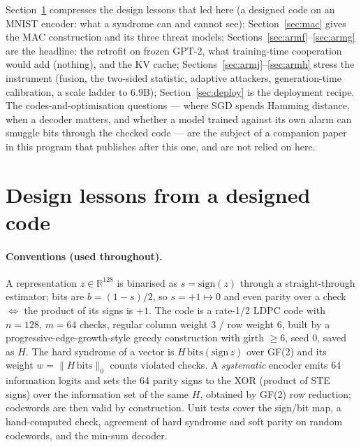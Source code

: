 \documentclass[10pt,twocolumn]{article}
\begin{document}
Section~\ref{sec:lessons} compresses the design lessons that led here (a designed
code on an MNIST encoder: what a syndrome can and cannot see); Section~\ref{sec:mac}
gives the MAC construction and its three threat models; Sections~\ref{sec:armf}--\ref{sec:armg}
are the headline: the retrofit on frozen GPT-2, what training-time cooperation
would add (nothing), and the KV cache; Sections~\ref{sec:armj}--\ref{sec:armh} stress the
instrument (fusion, the two-sided statistic, adaptive attackers, generation-time
calibration, a scale ladder to 6.9B); Section~\ref{sec:deploy} is the deployment
recipe. The codes-and-optimisation questions --- where SGD spends Hamming distance,
when a decoder matters, and whether a model trained against its own alarm can
smuggle bits through the checked code --- are the subject of a companion paper in this program that publishes after this one, and are not relied on here.

\section{Design lessons from a designed code}\label{sec:lessons}
\paragraph{Conventions (used throughout).} A representation $z\in\mathbb{R}^{128}$
is binarised as $s=\mathrm{sign}(z)$ through a straight-through estimator; bits are
$b=(1-s)/2$, so $s{=}+1\mapsto0$ and even parity over a check $\Leftrightarrow$ the
product of its signs is $+1$. The code is a rate-1/2 LDPC code with $n{=}128$,
$m{=}64$ checks, regular column weight 3 / row weight 6, built by a
progressive-edge-growth-style greedy construction with girth $\ge6$, seed 0, saved as
$H$. The hard syndrome of a vector is $H\,\mathrm{bits}(\mathrm{sign}\,z)$ over GF(2)
and its weight $w=\|H\,\mathrm{bits}\|_0$ counts violated checks. A \emph{systematic}
encoder emits 64 information logits and sets the 64 parity signs to the XOR (product
of STE signs) over the information set of the same $H$, obtained by GF(2) row
reduction; codewords are then valid by construction. Unit tests cover the sign/bit
map, a hand-computed check, agreement of hard syndrome and soft parity on random
codewords, and the min-sum decoder.
\end{document}
